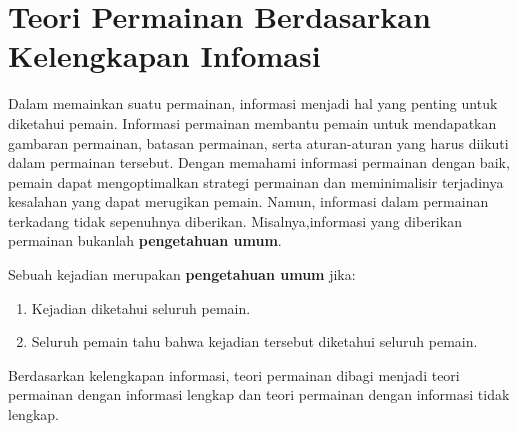 \section{Teori Permainan Berdasarkan Kelengkapan Infomasi}
Dalam memainkan suatu permainan, informasi menjadi hal yang penting untuk diketahui pemain. Informasi permainan membantu pemain untuk mendapatkan gambaran permainan, batasan permainan, serta aturan-aturan yang harus diikuti dalam permainan tersebut. Dengan memahami informasi permainan dengan baik, pemain dapat mengoptimalkan strategi permainan dan meminimalisir terjadinya kesalahan yang dapat merugikan pemain. Namun, informasi dalam permainan terkadang tidak sepenuhnya diberikan. Misalnya,informasi yang diberikan permainan bukanlah \textbf{pengetahuan umum}.

\begin{definisi}
    Sebuah kejadian merupakan \textbf{pengetahuan umum} jika:
    \begin{enumerate}
        \item Kejadian diketahui seluruh pemain.
        \item Seluruh pemain tahu bahwa kejadian tersebut diketahui seluruh pemain.
    \end{enumerate}
\end{definisi}

Berdasarkan kelengkapan informasi, teori permainan dibagi menjadi teori permainan dengan informasi lengkap dan teori permainan dengan informasi tidak lengkap.

